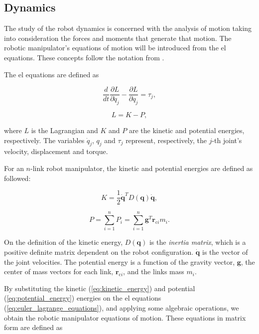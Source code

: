 \subsection{Dynamics}
\label{subsec:dynamics}

The study of the robot dynamics is concerned with the analysis of motion taking into consideration the forces and moments that generate that motion. The robotic manipulator's equations of motion will be introduced from the \gls{el} equations. These concepts follow the notation from \cite{Spong2005_robot_dynamics_control}.

The \gls{el} equations are defined as

\begin{equation}
    \label{eq:euler_lagrange_equations}
    \frac{d}{dt}\frac{\partial L}{\partial\dot{q}_j}-\frac{\partial L}{\partial q_j} = \tau_j ,
\end{equation}

\begin{equation}
    L = K - P,
\end{equation}

where $L$ is the Lagrangian and $K$ and $P$ are the kinetic and potential energies, respectively. The variables $\dot{q}_j$, $q_j$ and $\tau_j$ represent, respectively, the $j$-th joint's velocity, displacement and torque.

For an $n$-link robot manipulator, the kinetic and potential energies are defined as followed:

\begin{equation}
    \label{eq:kinetic_energy}
    K = \frac{1}{2}\dot{\boldsymbol{q}}^T D(\boldsymbol{q}) \dot{\boldsymbol{q}},
\end{equation}

\begin{equation}
    \label{eq:potential_energy}
    P = \sum^{n}_{i=1} P_i = \sum^{n}_{i=1} \boldsymbol{g}^T \boldsymbol{r}_{\text{c}i} m_i .
\end{equation}

On the definition of the kinetic energy, $D(\boldsymbol{q})$ is the \emph{inertia matrix}, which is a positive definite matrix dependent on the robot configuration. $\dot{\boldsymbol{q}}$ is the vector of the joint velocities.
The potential energy is a function of the gravity vector, $\boldsymbol{g}$, the center of mass vectors for each link, $\boldsymbol{r}_{\text{c}i}$, and the links mass $m_i$.

By substituting the kinetic (\ref{eq:kinetic_energy}) and potential (\ref{eq:potential_energy}) energies on the \gls{el} equations (\ref{eq:euler_lagrange_equations}), and applying some algebraic operations, we obtain the robotic manipulator equations of motion. These equations in matrix form are defined as

